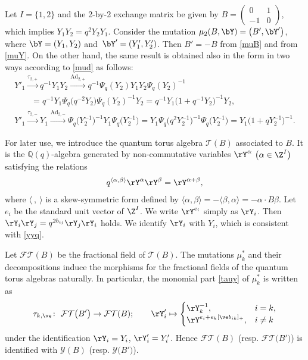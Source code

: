 \begin{Example}
 Let $I = \{1,2\}$ and the 2-by-2 exchange matrix be given by
 $B = \left(\begin{smallmatrix}0 & 1 \\ -1 & 0 \end{smallmatrix}\right)$, which implies
 $Y_1Y_2 = q^2Y_2Y_1$. Consider the mutation
 $\mu_2(B,\bY) = \bigl(B', \bY'\bigr)$, where $\bY = (Y_1, Y_2)$ and~${\bY' = (Y'_1, Y'_2)}$. Then $B'=-B$ from \eqref{muB} and
  from \eqref{muY}. On the other hand,
 the same result is obtained also in the form
  in two ways according to
 \eqref{mud} as follows:
\begin{gather*}
Y'_1 \overset{\tau_{2,+}}{\longrightarrow} q^{-1}Y_1Y_2
\overset{\mathrm{Ad}_{2,+}}{\longrightarrow} q^{-1}\Psi_q(Y_2)Y_1Y_2\Psi_q(Y_2)^{-1}\\
\qquad= q^{-1}Y_1\Psi_q\bigl(q^{-2}Y_2\bigr)\Psi_q(Y_2)^{-1}Y_2
= q^{-1}Y_1\bigl(1+q^{-1}Y_2\bigr)^{-1}Y_2,
\\
Y'_1 \overset{\tau_{2,-}}{\longrightarrow} Y_1
\overset{\mathrm{Ad}_{2,-}}{\longrightarrow} \Psi_q\bigl(Y_2^{-1}\bigr)^{-1}Y_1 \Psi_q\bigl(Y_2^{-1}\bigr)
= Y_1\Psi_q\bigl(q^2Y_2^{-1}\bigr)^{-1}\Psi_q\bigl(Y_2^{-1}\bigr) =Y_1\bigl(1+qY^{-1}_2\bigr)^{-1}.
\end{gather*}
\end{Example}

For later use, we introduce the quantum torus algebra $\mathcal{T}(B)$ associated to $B$.
It is the $\mathbb{Q}(q)$-algebra generated by
non-commutative variables $\rY^\alpha$ $\bigl(\alpha \in \Z^{I}\bigr)$ satisfying the
relations
\begin{align}\label{qyy}
q^{\langle \alpha,\beta \rangle} \rY^\alpha \rY^\beta
= \rY^{\alpha + \beta},
\end{align}
where $\langle ~,~ \rangle$ is a skew-symmetric form defined by
$\langle \alpha,\beta \rangle = - \langle \beta,\alpha \rangle =
-\alpha \cdot B \beta$.
Let $e_i$ be the standard unit vector of
$\Z^I$. We write $\rY^{e_i}$ simply as $\rY_i$. Then
$\rY_i \rY_j = q^{2 b_{ij}} \rY_j \rY_i$ holds. We identify $\rY_i$ with
$Y_i$, which is consistent with \eqref{yyq}.

Let $\mathcal{FT}(B)$ be the fractional field of $\mathcal{T}(B)$.
The mutations $\mu_k^{\ast}$
and their decompositions
induce the morphisms for the fractional fields of the quantum torus algebras naturally.
%
In particular, the monomial part \eqref{tauy} of $\mu_k^{\ast}$ is written as
\begin{align}\label{taft}
\tau_{k,\ve} \colon\ \mathcal{FT}\bigl(B'\bigr) \to \mathcal{FT}(B); \qquad
\rY'_i \mapsto \begin{cases}
\rY_k^{-1}, & i= k,
\\
\rY^{e_i + e_k [\ve b_{ik}]_+}, & i \neq k
\end{cases}
\end{align}
under the identification $\rY_i = Y_i$, $\rY'_i = Y'_i$.
Hence $\mathcal{FT}(B)$ (resp. $\mathcal{FT}\bigl(B'\bigr)$) is identified with $\mathcal{Y}(B)$ (resp. $\mathcal{Y}\bigl(B'\bigr)$).

